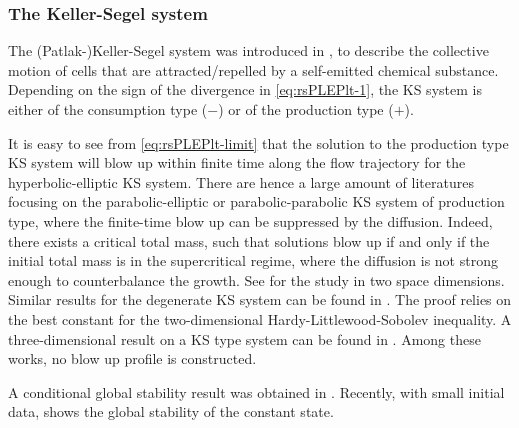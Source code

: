 \documentclass[11pt]{article}
\theoremstyle{plain}
\theoremstyle{definition}
\theoremstyle{remark}
\numberwithin{equation}{section}
\begin{document}
    \subsubsection*{The Keller-Segel system}

    The (Patlak-)Keller-Segel system was introduced in \cite{patlakRandomWalkPersistence1953,kellerInitiationSlimeMold1970}, to describe the collective motion of cells that are attracted/repelled by a self-emitted chemical substance. Depending on the sign of the divergence in \eqref{eq:rsPLEPlt-1}, the KS system is either of the consumption type ($-$) or of the production type ($+$). 

    It is easy to see from \eqref{eq:rsPLEPlt-limit} that the solution to the production type KS system will blow up within finite time along the flow trajectory for the hyperbolic-elliptic KS system. There are hence a large amount of literatures focusing on the parabolic-elliptic or parabolic-parabolic KS system of production type, where the finite-time blow up can be suppressed by the diffusion. Indeed, there exists a critical total mass, such that solutions blow up if and only if the initial total mass is in the supercritical regime, where the diffusion is not strong enough to counterbalance the growth. See \cite{eganafernandezUniquenessLongTime2016,blanchetTwodimensionalKellerSegelModel2006,blanchetInfiniteTimeAggregation2008} for the study in two space dimensions. Similar results for the degenerate KS system can be found in \cite{sugiyamaGlobalExistenceSubcritical2006,sugiyamaApplicationBestConstant2007,blanchetCriticalMassPatlak2009}. The proof relies on the best constant for the two-dimensional Hardy-Littlewood-Sobolev inequality. A three-dimensional result on a KS type system can be found in \cite{ulusoyKellerSegelType2017}. Among these works, no blow up profile is constructed. 

    A conditional global stability result was obtained in \cite{feireislConvergenceEquilibriaKeller2007}. Recently, with small initial data, \cite{hsiehLongtimeDynamicsClassical2024} shows the global stability of the constant state. 
\end{document}
